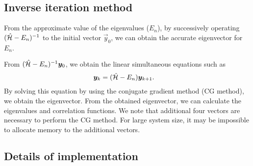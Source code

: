 \subsection{Inverse iteration method}

From the approximate value of the eigenvalues ($E_{n}$),
by successively operating $(\hat{\mathcal{H}}-E_{n})^{-1}$
to the initial vector $\vec{y}_{0}$,
we can obtain the accurate eigenvector for $E_{n}$.

From $(\hat{\mathcal{H}}-E_{n})^{-1}\boldsymbol y_{0}$,
we obtain the linear simultaneous equations such as  
\begin{align}
\boldsymbol y_{k}&=(\hat{\mathcal{H}}-E_{n})\boldsymbol y_{k+1}.
\end{align}
By solving this equation by using the
conjugate gradient method (CG method),
we obtain the eigenvector.
From the obtained eigenvector,
we can calculate the eigenvalues and correlation functions. 
We note that additional four vectors are necessary to
perform the CG method.
For large system size,
it may be impossible to allocate memory to the
additional vectors.

\subsection{Details of implementation}

